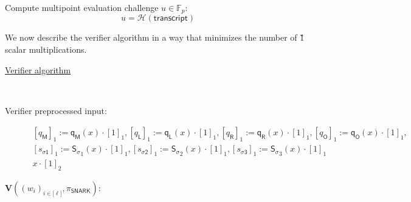 \documentclass[11pt]{article} %
\newcommand{\F}{\ensuremath{\mathbb F}\xspace}
\newcommand{\hash}{\ensuremath{\mathcal{H}}\xspace}
\newcommand{\ver}{\ensuremath{\mathsf{\mathbf{V}}}\xspace}
\newcommand{\sigpoly}{\ensuremath{\mathsf{S_{\sigma}}}\xspace}
\newcommand{\selmultpoly}{\ensuremath{\mathsf{q_M}}\xspace}
\newcommand{\selleftpoly}{\ensuremath{\mathsf{q_L}}\xspace}
\newcommand{\selrightpoly}{\ensuremath{\mathsf{q_R}}\xspace}
\newcommand{\seloutpoly}{\ensuremath{\mathsf{q_O}}\xspace}
\newcommand{\sigcomma}{\ensuremath{[s_{\mathsf{\sigma1}}]_1}\xspace}
\newcommand{\sigcommb}{\ensuremath{[s_{\mathsf{\sigma2}}]_1}\xspace}
\newcommand{\sigcommc}{\ensuremath{[s_{\mathsf{\sigma3}}]_1}\xspace}
\newcommand{\selleftcomm}{\ensuremath{[q_\mathsf{L}]_1}\xspace}
\newcommand{\selrightcomm}{\ensuremath{[q_\mathsf{R}]_1}\xspace}
\newcommand{\seloutcomm}{\ensuremath{[q_\mathsf{O}]_1}\xspace}
\newcommand{\selmultcomm}{\ensuremath{[q_\mathsf{M}]_1}\xspace}
\newcommand{\snark}{\ensuremath{\mathsf{snark}}\xspace}
\newcommand{\Verify}{\mathcal{V}}
\newcommand{\Vsnark}{\ver}%
\newcommand{\transcript}{\ensuremath{\mathsf{transcript}}\xspace}
\begin{document}
	Compute multipoint evaluation challenge $u \in \F_p:$
	$$
	u = \hash(\transcript)
	$$

	We now describe the verifier algorithm in a way that minimizes the number of \G1 scalar multiplications.
	\begin{description}
	\item[\underline{Verifier algorithm}] \ \\
	\item[Verifier preprocessed input:] 
	$$
	\begin{array}{l}
 \selmultcomm := \selmultpoly(x) \cdot [1]_1, \selleftcomm := \selleftpoly(x) \cdot [1]_1, \selrightcomm := \selrightpoly(x) \cdot [1]_1, \seloutcomm := \seloutpoly(x) \cdot [1]_1, \\
	\sigcomma := \sigpoly_1(x) \cdot [1]_1, \sigcommb := \sigpoly_2(x) \cdot [1]_1, \sigcommc := \sigpoly_3 (x)\cdot [1]_1 \\
	x \cdot [1]_2
	\end{array}
	$$
	\item[$\Vsnark((w_i)_{i \in {[}\ell{]}}, \pi_{\mathsf{SNARK}})$:] \ \\
\end{description}
\noindent
\end{document}
